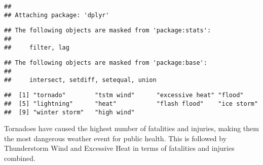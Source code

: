 \documentclass[
]{article}
\newenvironment{Shaded}{\begin{snugshade}}{\end{snugshade}}
\newcommand{\AttributeTok}[1]{\textcolor[rgb]{0.13,0.29,0.53}{#1}}
\newcommand{\CommentTok}[1]{\textcolor[rgb]{0.56,0.35,0.01}{\textit{#1}}}
\newcommand{\ConstantTok}[1]{\textcolor[rgb]{0.56,0.35,0.01}{#1}}
\newcommand{\DecValTok}[1]{\textcolor[rgb]{0.00,0.00,0.81}{#1}}
\newcommand{\FunctionTok}[1]{\textcolor[rgb]{0.13,0.29,0.53}{\textbf{#1}}}
\newcommand{\NormalTok}[1]{#1}
\newcommand{\OtherTok}[1]{\textcolor[rgb]{0.56,0.35,0.01}{#1}}
\newcommand{\SpecialCharTok}[1]{\textcolor[rgb]{0.81,0.36,0.00}{\textbf{#1}}}
\begin{document}
\begin{verbatim}
## 
## Attaching package: 'dplyr'
\end{verbatim}

\begin{verbatim}
## The following objects are masked from 'package:stats':
## 
##     filter, lag
\end{verbatim}

\begin{verbatim}
## The following objects are masked from 'package:base':
## 
##     intersect, setdiff, setequal, union
\end{verbatim}

\begin{Shaded}
\end{Shaded}

\begin{verbatim}
##  [1] "tornado"        "tstm wind"      "excessive heat" "flood"         
##  [5] "lightning"      "heat"           "flash flood"    "ice storm"     
##  [9] "winter storm"   "high wind"
\end{verbatim}

Tornadoes have caused the highest number of fatalities and injuries,
making them the most dangerous weather event for public health. This is
followed by Thunderstorm Wind and Excessive Heat in terms of fatalities
and injuries combined.
\end{document}

